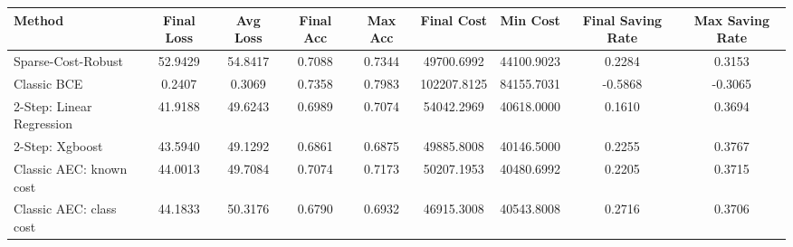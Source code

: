 \begin{tabular}{lcccccccc}
\toprule
Method & Final Loss & Avg Loss & Final Acc & Max Acc & Final Cost & Min Cost & Final Saving Rate & Max Saving Rate \\
\midrule
Sparse-Cost-Robust & 52.9429 & 54.8417 & 0.7088 & 0.7344 & 49700.6992 & 44100.9023 & 0.2284 & 0.3153 \\
Classic BCE & 0.2407 & 0.3069 & 0.7358 & 0.7983 & 102207.8125 & 84155.7031 & -0.5868 & -0.3065 \\
2-Step: Linear Regression & 41.9188 & 49.6243 & 0.6989 & 0.7074 & 54042.2969 & 40618.0000 & 0.1610 & 0.3694 \\
2-Step: Xgboost & 43.5940 & 49.1292 & 0.6861 & 0.6875 & 49885.8008 & 40146.5000 & 0.2255 & 0.3767 \\
Classic AEC: known cost & 44.0013 & 49.7084 & 0.7074 & 0.7173 & 50207.1953 & 40480.6992 & 0.2205 & 0.3715 \\
Classic AEC: class cost & 44.1833 & 50.3176 & 0.6790 & 0.6932 & 46915.3008 & 40543.8008 & 0.2716 & 0.3706 \\
\bottomrule
\end{tabular}
